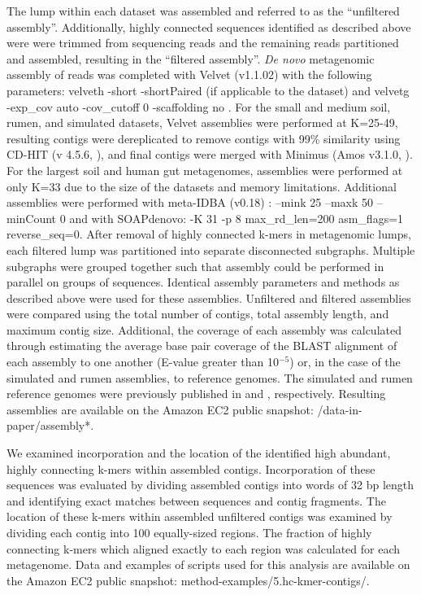 \documentclass[10pt]{article}
\begin{document}
The lump within each dataset was assembled and referred to as the ``unfiltered assembly''.  Additionally, highly connected sequences identified as described above were were trimmed from sequencing reads and the remaining reads partitioned and assembled, resulting in the ``filtered assembly''.  \emph{De novo} metagenomic assembly of reads was completed with Velvet (v1.1.02) with the following parameters: velveth -short -shortPaired (if applicable to the dataset) and velvetg -exp\_cov auto -cov\_cutoff 0 -scaffolding no \cite{Zerbino:2008p665}.  For the small and medium soil, rumen, and simulated datasets, Velvet assemblies were performed at K=25-49, resulting contigs were dereplicated to remove contigs with 99\% similarity using CD-HIT (v 4.5.6, \cite{Li:2001p1337}), and final contigs were merged with Minimus (Amos v3.1.0, \cite{Sommer:2007p1253}).  For the largest soil and human gut metagenomes, assemblies were performed at only K=33 due to the size of the datasets and memory limitations.  Additional assemblies were performed with meta-IDBA (v0.18) \cite{Peng:2011p898} : --mink 25 --maxk 50 --minCount 0 and with SOAPdenovo:  -K 31 -p 8  max\_rd\_len=200 asm\_flags=1 reverse\_seq=0.  After removal of highly connected k-mers in metagenomic lumps, each filtered lump was partitioned into separate disconnected subgraphs.  Multiple subgraphs were grouped together such that assembly could be performed in parallel on groups of sequences.  Identical assembly parameters and methods as described above were used for these assemblies.  Unfiltered and filtered assemblies were compared using the total number of contigs, total assembly length, and maximum contig size.  Additional, the coverage of each assembly was calculated through estimating the average base pair coverage of the BLAST alignment of each assembly to one another (E-value greater than 10$^{-5}$) or, in the case of the simulated and rumen assemblies, to reference genomes.  The simulated and rumen reference genomes were previously published in \cite{Hess:2011p686} and \cite{Pignatelli:2011p742}, respectively.  Resulting assemblies are available on the Amazon EC2 public snapshot: /data-in-paper/assembly*.

We examined incorporation and the location of the identified high abundant, highly connecting k-mers within assembled contigs.  Incorporation of these sequences was evaluated by dividing assembled contigs into words of 32 bp length and identifying exact matches between sequences and contig fragments.  The location of these k-mers within assembled unfiltered contigs was examined by dividing each contig into 100 equally-sized regions.  The fraction of highly connecting k-mers which aligned exactly to each region was calculated for each metagenome. Data and examples of scripts used for this analysis are available on the Amazon EC2 public snapshot: method-examples/5.hc-kmer-contigs/.
\end{document}
